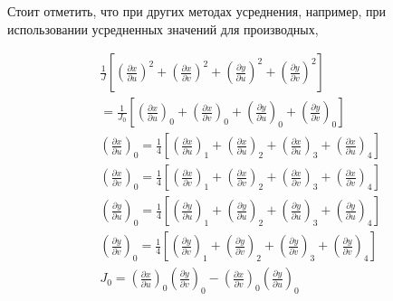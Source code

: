 \documentclass[a4paper,14pt,russian]{extreport}
\renewcommand{\_}{\kern-1.5pt\textunderscore\kern-1.5pt}
\begin{document}
Стоит отметить, что при других методах усреднения, например, при использовании усредненных значений для производных,

\begin{equation}
\begin{aligned}
& \frac{1}{J}\left[\left(\frac{\partial x}{\partial u}\right)^2 + \left(\frac{\partial x}{\partial v}\right)^2 + \left(\frac{\partial y}{\partial u}\right)^2 + \left(\frac{\partial y}{\partial v}\right)^2\right] \\
& = \frac{1}{J_0}\left[\left(\frac{\partial x}{\partial u}\right)_0 + \left(\frac{\partial x}{\partial v}\right)_0 + \left(\frac{\partial y}{\partial u}\right)_0 + \left(\frac{\partial y}{\partial v}\right)_0\right] \\
& \left(\frac{\partial x}{\partial u}\right)_0 = \frac{1}{4}\left[\left(\frac{\partial x}{\partial u}\right)_1 + \left(\frac{\partial x}{\partial u}\right)_2 + \left(\frac{\partial x}{\partial u}\right)_3 + \left(\frac{\partial x}{\partial u}\right)_4\right] \\
& \left(\frac{\partial x}{\partial v}\right)_0 = \frac{1}{4}\left[\left(\frac{\partial x}{\partial v}\right)_1 + \left(\frac{\partial x}{\partial v}\right)_2 + \left(\frac{\partial x}{\partial v}\right)_3 + \left(\frac{\partial x}{\partial v}\right)_4\right] \\
& \left(\frac{\partial y}{\partial u}\right)_0 = \frac{1}{4}\left[\left(\frac{\partial y}{\partial u}\right)_1 + \left(\frac{\partial y}{\partial u}\right)_2 + \left(\frac{\partial y}{\partial u}\right)_3 + \left(\frac{\partial y}{\partial u}\right)_4\right] \\
& \left(\frac{\partial y}{\partial v}\right)_0 = \frac{1}{4}\left[\left(\frac{\partial y}{\partial v}\right)_1 + \left(\frac{\partial y}{\partial v}\right)_2 + \left(\frac{\partial y}{\partial v}\right)_3 + \left(\frac{\partial y}{\partial v}\right)_4\right] \\
& J_0 = \left(\frac{\partial x}{\partial u}\right)_0\left(\frac{\partial y}{\partial v}\right)_0 - \left(\frac{\partial x}{\partial v}\right)_0\left(\frac{\partial y}{\partial u}\right)_0
\end{aligned}
\end{equation}
\end{document}
